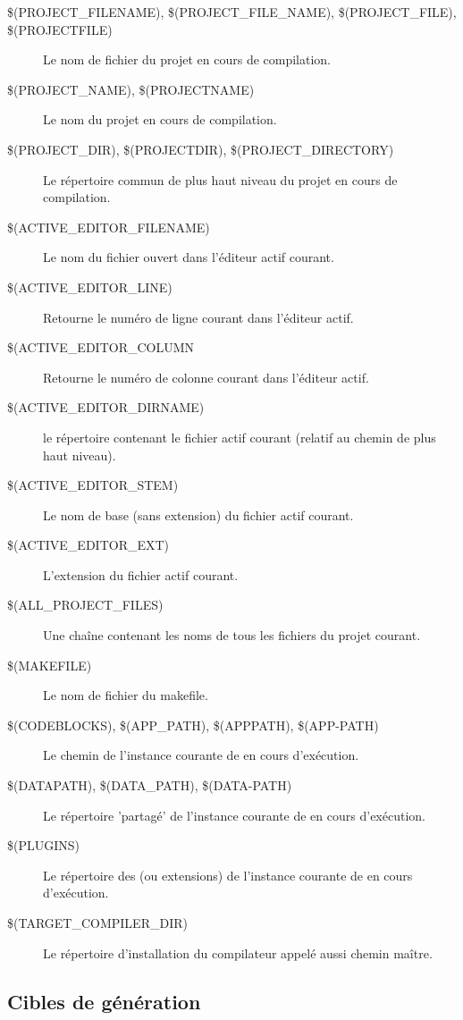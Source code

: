 \begin{description}
\item[{\footnotesize \$(PROJECT\_FILENAME), \$(PROJECT\_FILE\_NAME), \$(PROJECT\_FILE), \$(PROJECTFILE)}] Le nom de fichier du projet en cours de compilation.
\item[{\footnotesize \$(PROJECT\_NAME), \$(PROJECTNAME)}] Le nom du projet en cours de compilation.
\item[{\footnotesize \$(PROJECT\_DIR), \$(PROJECTDIR), \$(PROJECT\_DIRECTORY)}] Le répertoire commun de plus haut niveau du projet en cours de compilation.
\item[{\footnotesize \$(ACTIVE\_EDITOR\_FILENAME)}] Le nom du fichier ouvert dans l'éditeur actif courant.
\item[{\footnotesize \$(ACTIVE\_EDITOR\_LINE)}] Retourne le numéro de ligne courant dans l'éditeur actif.
\item[{\footnotesize \$(ACTIVE\_EDITOR\_COLUMN}] Retourne le numéro de colonne courant dans l'éditeur actif.
\item[{\footnotesize \$(ACTIVE\_EDITOR\_DIRNAME)}] le répertoire contenant le fichier actif courant (relatif au chemin de plus haut niveau).
\item[{\footnotesize \$(ACTIVE\_EDITOR\_STEM)}] Le nom de base (sans extension) du fichier actif courant.
\item[{\footnotesize \$(ACTIVE\_EDITOR\_EXT)}] L'extension du fichier actif courant.
\item[{\footnotesize \$(ALL\_PROJECT\_FILES)}] Une chaîne contenant les noms de tous les fichiers du projet courant.
\item[{\footnotesize \$(MAKEFILE)}] Le nom de fichier du makefile.
\item[{\footnotesize \$(CODEBLOCKS), \$(APP\_PATH), \$(APPPATH), \$(APP-PATH)}] Le chemin de l'instance courante de \codeblocks en cours d'exécution.
\item[{\footnotesize \$(DATAPATH), \$(DATA\_PATH), \$(DATA-PATH)}] Le répertoire 'partagé' de l'instance courante de \codeblocks en cours d'exécution.
\item[{\footnotesize \$(PLUGINS)}] Le répertoire des  (ou extensions) de l'instance courante de \codeblocks en cours d'exécution.
\item[{\footnotesize \$(TARGET\_COMPILER\_DIR)}] Le répertoire d'installation du compilateur appelé aussi chemin maître.
\end{description}

\subsection{Cibles de génération}

